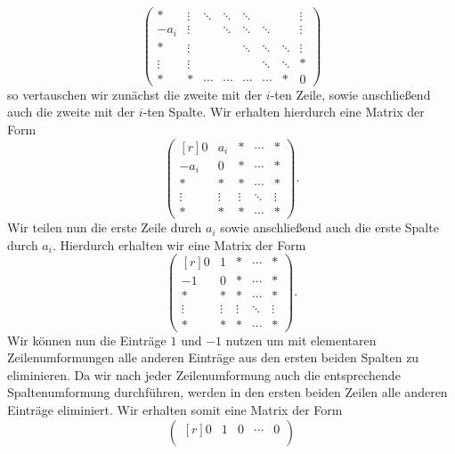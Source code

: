 \begin{enumerate}
\[\begin{pmatrix}
        *       & \vdots  & \ddots  & \ddots  & \ddots  &         &         & \vdots  \\
        -a_i    & \vdots  &         & \ddots  & \ddots  & \ddots  &         & \vdots  \\
        *       & \vdots  &         &         & \ddots  & \ddots  & \ddots  & \vdots  \\
        \vdots  & \vdots  &         &         &         & \ddots  & \ddots  & *       \\
        *       & *       & \cdots  & \cdots  & \cdots  & \cdots  & *       & 0
      \end{pmatrix}
    \]
    so vertauschen wir zunächst die zweite mit der $i$-ten Zeile, sowie anschließend auch die zweite mit der $i$-ten Spalte.
    Wir erhalten hierdurch eine Matrix der Form
    \[
      \begin{pmatrix*}[r]
         0      & a_i     & *       & \cdots  & *       \\
        -a_i    & 0       & *       & \cdots  & *       \\
         *      & *       & *       & \cdots  & *       \\
         \vdots & \vdots  & \vdots  & \ddots  & \vdots  \\
         *      & *       & *       & \cdots  & *
      \end{pmatrix*}.
    \]
    Wir teilen nun die erste Zeile durch $a_i$ sowie anschließend auch die erste Spalte durch $a_i$.
    Hierdurch erhalten wir eine Matrix der Form
    \[
      \begin{pmatrix*}[r]
         0      & 1       & *       & \cdots  & *       \\
        -1      & 0       & *       & \cdots  & *       \\
         *      & *       & *       & \cdots  & *       \\
         \vdots & \vdots  & \vdots  & \ddots  & \vdots  \\
         *      & *       & *       & \cdots  & *
      \end{pmatrix*}.
    \]
    Wir können nun die Einträge $1$ und $-1$ nutzen um mit elementaren Zeilenumformungen alle anderen Einträge aus den ersten beiden Spalten zu eliminieren.
    Da wir nach jeder Zeilenumformung auch die entsprechende Spaltenumformung durchführen, werden in den ersten beiden Zeilen alle anderen Einträge eliminiert.
    Wir erhalten somit eine Matrix der Form
    \[
      \begin{pmatrix*}[r]
         0      & 1       & 0       & \cdots  & 0       \\

\end{pmatrix*}\]
\end{enumerate}
